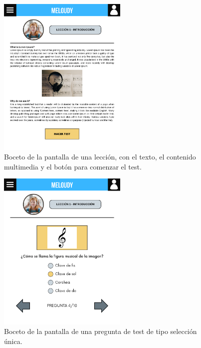 \begin{figure}[H]
    \centering
    \centerline{\includegraphics[width=0.55\textwidth, frame]{imagenes/c6/4.png}}
    \caption{Boceto de la pantalla de una lección, con el texto, el contenido multimedia y el botón para comenzar el test.}
    \label{fig:leccion}
\end{figure}

\begin{figure}[H]
    \centering
    \centerline{\includegraphics[width=0.55\textwidth, frame]{imagenes/c6/5.png}}
    \caption{Boceto de la pantalla de una pregunta de test de tipo selección única.}
    \label{fig:seleccionunica}
\end{figure}

